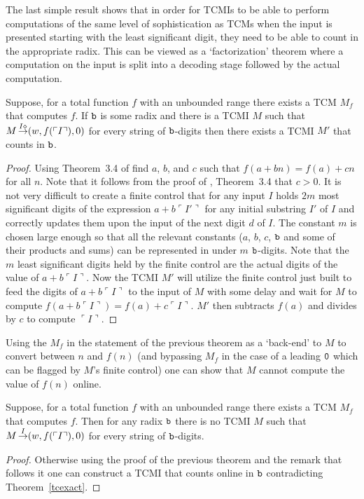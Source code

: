 \documentclass[12pt]{article}
\begin{document}
The last simple result shows that in order for TCMIs to be able to
perform computations of the same level of sophistication as TCMs
when the input is presented starting with the least significant digit,
they need to be able to count in the appropriate radix. This can be
viewed as a `factorization' theorem where a computation on the input
is split into a decoding stage followed by the actual computation.
\begin{theorem}\label{mmach}
Suppose, for a total function $f$ with an unbounded range there exists a
TCM $M_f$ that computes $f$. If ${\tt b}$ is some radix and there is a TCMI $M$ such that
$M\mathop{\to}\limits^{I\diamond}(w,f(\ulcorner I\urcorner),0)$ for
every string of ${\tt b}$-digits then there
exists a TCMI $M'$ that counts in ${\tt b}$. 
\end{theorem}
\begin{proof}
Using Theorem~3.4 of \cite{ibarra} find $a$, $b$, and $c$ such that
$f(a+bn)=f(a)+cn$ for all $n$. Note that it follows from the proof of
\cite{ibarra}, Theorem~3.4 that $c>0$. It is not very difficult to create a finite
control that for any input $I$ holds $2m$ most significant digits of the expression
$a+b\ulcorner I'\urcorner$ for any initial substring $I'$ of $I$ and
correctly updates them upon the input of 
the next digit $d$ of $I$. The constant $m$ is chosen large enough so
that all the relevant constants ($a$, $b$, $c$, ${\tt b}$ and some of
their products and sums) can be represented in under $m$
${\tt b}$-digits. Note that the $m$ least significant digits held by the
finite control are the actual digits of the value of $a+b\ulcorner
I\urcorner$. Now the TCMI $M'$ will utilize the finite control just
built to feed the digits of $a+b\ulcorner I\urcorner$ to the input of
$M$ with some delay and wait for $M$ to compute $f(a+b\ulcorner
I\urcorner)=f(a)+c\ulcorner I\urcorner$. $M'$ then subtracts $f(a)$
and divides by $c$ to compute $\ulcorner I\urcorner$.
\end{proof}

Using the $M_f$ in the statement of the previous theorem as a
`back-end' to $M$ to convert between $n$ and $f(n)$ (and bypassing
$M_f$ in the case of a leading ${\tt 0}$ which can be flagged by $M$'s
finite control) one can show that $M$ cannot compute the value of
$f(n)$ online.

\begin{theorem}\label{tcmio}
Suppose, for a total function $f$ with an unbounded range there exists a
TCM $M_f$ that computes $f$. Then for any radix ${\tt b}$ there is no TCMI $M$ such that
$M\mathop{\to}\limits^{I}(w,f(\ulcorner I\urcorner),0)$ for every string of
${\tt b}$-digits.
\end{theorem}
\begin{proof}
Otherwise using the proof of the previous theorem and the remark that
follows it one can construct a TCMI that counts online in ${\tt b}$
contradicting Theorem~\ref{tcexact}.
\end{proof}
\end{document}
